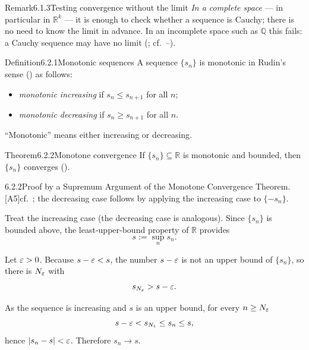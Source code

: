 \documentclass[main.tex]{subfiles}
\begin{document}
\begin{ObjL}{Remark}{6.1.3}{Testing convergence without the limit}
\emph{In a complete space} --- in particular in $\mathbb R^k$ --- it is enough to check whether a
sequence is Cauchy; there is no need to know the limit in advance. In an incomplete space such as
$\mathbb Q$ this fails: a Cauchy sequence may have no limit (; cf.\ --).
\end{ObjL}


\begin{Obj}{Definition}{6.2.1}{Monotonic sequences}
A sequence $\{s_n\}$ is monotonic in Rudin's sense () as follows:
\begin{itemize}[leftmargin=1.3em,topsep=2pt,itemsep=1pt,label=\textbullet]
  \item \emph{monotonic increasing} if $s_n\le s_{n+1}$ for all $n$;
  \item \emph{monotonic decreasing} if $s_n\ge s_{n+1}$ for all $n$.
\end{itemize}
``Monotonic'' means either increasing or decreasing.
\end{Obj}

\begin{Obj}{Theorem}{6.2.2}{Monotone convergence}
If $\{s_n\}\subseteq\mathbb R$ is monotonic and bounded, then $\{s_n\}$ converges
().
\end{Obj}
\begin{Prf}{6.2.2}{Proof by a Supremum Argument of the Monotone Convergence Theorem.}{[A5]\quad cf.\ ; the decreasing case follows by applying the increasing case to $\{-s_n\}$.}
\item Treat the increasing case (the decreasing case is analogous). Since $\{s_n\}$ is bounded above, the least-upper-bound property of $\mathbb R$ provides
  \[ s := \sup_n s_n . \]
\item Let $\varepsilon>0$. Because $s-\varepsilon<s$, the number $s-\varepsilon$ is not an upper bound of $\{s_n\}$, so there is $N_\varepsilon$ with
  \[ s_{N_\varepsilon} > s-\varepsilon . \]
\item As the sequence is increasing and $s$ is an upper bound, for every $n\ge N_\varepsilon$
  \[ s-\varepsilon < s_{N_\varepsilon} \le s_n \le s , \]
  hence $|s_n-s|<\varepsilon$. Therefore $s_n\to s$.
\end{Prf}
\end{document}
